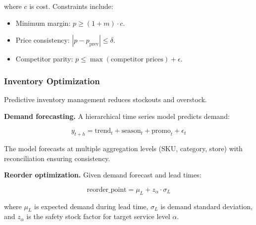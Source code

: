 where $c$ is cost. Constraints include:
\begin{itemize}
\item Minimum margin: $p \geq (1 + m) \cdot c$.
\item Price consistency: $|p - p_{\text{prev}}| \leq \delta$.
\item Competitor parity: $p \leq \max(\text{competitor prices}) + \epsilon$.
\end{itemize}

\subsubsection{Inventory Optimization}

Predictive inventory management reduces stockouts and overstock.

\textbf{Demand forecasting.} A hierarchical time series model \cite{hyndman2011} predicts demand:

\begin{equation}
y_{t+h} = \text{trend}_t + \text{season}_t + \text{promo}_t + \epsilon_t
\end{equation}

The model forecasts at multiple aggregation levels (SKU, category, store) with reconciliation ensuring consistency.

\textbf{Reorder optimization.} Given demand forecast and lead times:

\begin{equation}
\text{reorder\_point} = \mu_L + z_\alpha \cdot \sigma_L
\end{equation}

where $\mu_L$ is expected demand during lead time, $\sigma_L$ is demand standard deviation, and $z_\alpha$ is the safety stock factor for target service level $\alpha$.

